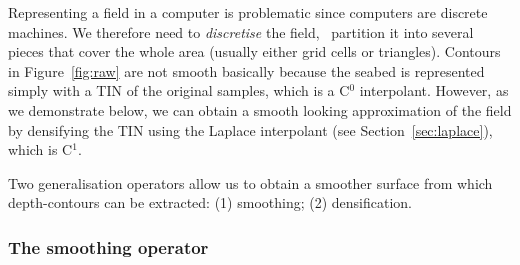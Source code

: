 Representing a field in a computer is problematic since computers are discrete machines.
We therefore need to \emph{discretise} the field, \ie\ partition it into several pieces that cover the whole area (usually either grid cells or triangles).
Contours in Figure~\ref{fig:raw} are not smooth basically because the seabed is represented simply with a TIN of the original samples, which is a C$^0$ interpolant.
However, as we demonstrate below, we can obtain a smooth looking approximation of the field by densifying the TIN using the Laplace interpolant (see Section~\ref{sec:laplace}), which is C$^1$.

%

Two generalisation operators allow us to obtain a smoother surface from which depth-contours can be extracted: (1) smoothing; (2) densification.


%
\subsubsection{The smoothing operator}
\label{chap:myapproach:smoothing}


